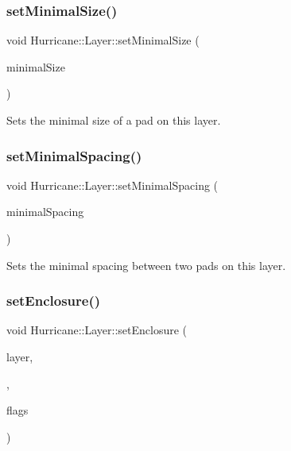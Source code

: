 \subsubsection{\texorpdfstring{set\+Minimal\+Size()}{setMinimalSize()}}
{\footnotesize\ttfamily void Hurricane\+::\+Layer\+::set\+Minimal\+Size (\begin{DoxyParamCaption}\item[{const \mbox{\hyperlink{group__DbUGroup_ga4fbfa3e8c89347af76c9628ea06c4146}{Db\+U\+::\+Unit}} \&}]{minimal\+Size }\end{DoxyParamCaption})}

Sets the minimal size of a pad on this layer. \mbox{\label{classHurricane_1_1Layer_a81a8a24526e8535fba5a35cdcc194a8f}} 
\subsubsection{\texorpdfstring{set\+Minimal\+Spacing()}{setMinimalSpacing()}}
{\footnotesize\ttfamily void Hurricane\+::\+Layer\+::set\+Minimal\+Spacing (\begin{DoxyParamCaption}\item[{const \mbox{\hyperlink{group__DbUGroup_ga4fbfa3e8c89347af76c9628ea06c4146}{Db\+U\+::\+Unit}} \&}]{minimal\+Spacing }\end{DoxyParamCaption})}

Sets the minimal spacing between two pads on this layer. \mbox{\label{classHurricane_1_1Layer_a04e9c983525d074508d7e10107c1c3c7}} 
\subsubsection{\texorpdfstring{set\+Enclosure()}{setEnclosure()}}
{\footnotesize\ttfamily void Hurricane\+::\+Layer\+::set\+Enclosure (\begin{DoxyParamCaption}\item[{const \mbox{\hyperlink{classHurricane_1_1BasicLayer}{Basic\+Layer}} $\ast$}]{layer,  }\item[{\mbox{\hyperlink{group__DbUGroup_ga4fbfa3e8c89347af76c9628ea06c4146}{Db\+U\+::\+Unit}}}]{,  }\item[{uint32\+\_\+t}]{flags }\end{DoxyParamCaption})\hspace{0.3cm}{\ttfamily [virtual]}}

